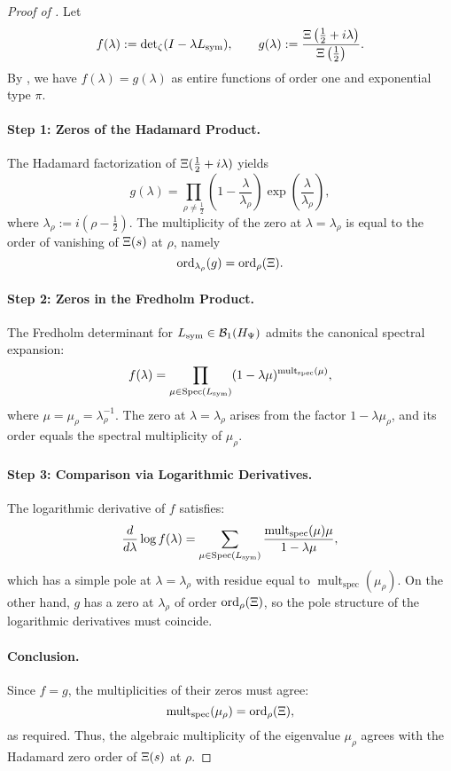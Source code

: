\begin{proof}[Proof of ]
Let
\[
f(\lambda) := \det\nolimits_\zeta(I - \lambda L_{\mathrm{sym}}), \qquad g(\lambda) := \frac{\Xi\left( \tfrac{1}{2} + i\lambda \right)}{\Xi\left( \tfrac{1}{2} \right)}.
\]
By , we have \( f(\lambda) = g(\lambda) \) as entire functions of order one and exponential type \( \pi \).

\paragraph{Step 1: Zeros of the Hadamard Product.}
The Hadamard factorization of \( \Xi(\tfrac{1}{2} + i\lambda) \) yields
\[
g(\lambda) = \prod_{\rho \ne \tfrac{1}{2}} \left(1 - \frac{\lambda}{\lambda_\rho}\right) \exp\left( \frac{\lambda}{\lambda_\rho} \right),
\]
where \( \lambda_\rho := i(\rho - \tfrac{1}{2}) \). The multiplicity of the zero at \( \lambda = \lambda_\rho \) is equal to the order of vanishing of \( \Xi(s) \) at \( \rho \), namely
\[
\operatorname{ord}_{\lambda_\rho}(g) = \operatorname{ord}_\rho(\Xi).
\]

\paragraph{Step 2: Zeros in the Fredholm Product.}
The Fredholm determinant for \( L_{\mathrm{sym}} \in \mathcal{B}_1(H_{\Psi}) \) admits the canonical spectral expansion:
\[
f(\lambda) = \prod_{\mu \in \operatorname{Spec}(L_{\mathrm{sym}})} (1 - \lambda \mu)^{\operatorname{mult}_{\mathrm{spec}}(\mu)},
\]
where \( \mu = \mu_\rho = \lambda_\rho^{-1} \). The zero at \( \lambda = \lambda_\rho \) arises from the factor \( 1 - \lambda \mu_\rho \), and its order equals the spectral multiplicity of \( \mu_\rho \).

\paragraph{Step 3: Comparison via Logarithmic Derivatives.}
The logarithmic derivative of \( f \) satisfies:
\[
\frac{d}{d\lambda} \log f(\lambda) = \sum_{\mu \in \operatorname{Spec}(L_{\mathrm{sym}})} \frac{\operatorname{mult}_{\mathrm{spec}}(\mu) \mu}{1 - \lambda \mu},
\]
which has a simple pole at \( \lambda = \lambda_\rho \) with residue equal to \( \operatorname{mult}_{\mathrm{spec}}(\mu_\rho) \). On the other hand, \( g \) has a zero at \( \lambda_\rho \) of order \( \operatorname{ord}_\rho(\Xi) \), so the pole structure of the logarithmic derivatives must coincide.

\paragraph{Conclusion.}
Since \( f = g \), the multiplicities of their zeros must agree:
\[
\operatorname{mult}_{\mathrm{spec}}(\mu_\rho) = \operatorname{ord}_\rho(\Xi),
\]
as required. Thus, the algebraic multiplicity of the eigenvalue \( \mu_\rho \) agrees with the Hadamard zero order of \( \Xi(s) \) at \( \rho \).
\end{proof}

